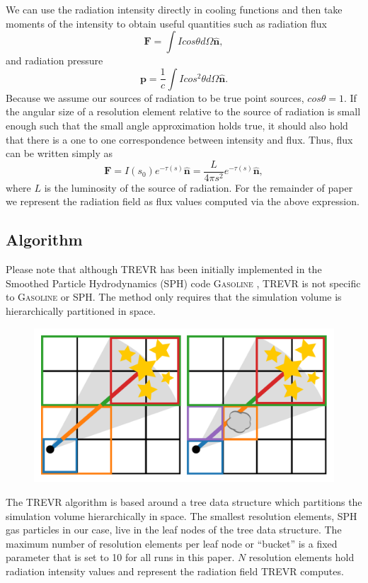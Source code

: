\documentclass[fleq,usenatbib]{mnras}
\newcommand{\acro}{TREVR}
\begin{document}
We can use the radiation intensity directly in cooling functions and then take 
moments of the intensity to obtain useful quantities such as radiation flux 
\begin{equation}
\label{eq:flux}
\mathbf{F} = \int I cos\theta d\Omega \mathbf{\hat{n}},
\end{equation}
and radiation pressure
\begin{equation}
\label{eq:pressure}
\mathbf{p} = \frac{1}{c}\int I cos^2\theta d\Omega \mathbf{\hat{n}}.
\end{equation}
Because we assume our sources of radiation to be true point sources, 
$cos\theta = 1$. If the angular size of a resolution element relative to the 
source of radiation is small enough such that the small angle approximation 
holds true, it should also hold that there is a one to one correspondence 
between intensity and flux. Thus, flux can be written simply as 
\begin{equation}
\label{eq:simpflux}
\mathbf{F} = I(s_0)e^{-\tau(s)} \mathbf{\hat{n}} = \frac{L}{4\pi s^2}
e^{-\tau(s)} \mathbf{\hat{n}},
\end{equation}
where $L$ is the luminosity of the source of radiation. For the remainder of 
paper we represent the radiation field as flux values computed via the above 
expression. 

\subsection{Algorithm}\label{sec:algo}
Please note that although \acro{} has been initially implemented in the 
Smoothed Particle Hydrodynamics (SPH) code \textsc{Gasoline} 
\citep{wadsleyEt03}, \acro{} is not specific to \textsc{Gasoline} or SPH. The 
method only requires that the simulation volume is hierarchically partitioned 
in space.
 
\begin{figure}
\includegraphics[width=1\linewidth]{Figures/algorithm.pdf}
\caption{}
\label{fig:algorithm}
\end{figure}
The \acro{} algorithm is based around a tree data structure which partitions 
the simulation volume hierarchically in space. The smallest resolution 
elements, SPH gas particles in our case, live in the leaf nodes of the tree
data structure. The maximum number of resolution elements per leaf node or 
``bucket'' is a fixed parameter that is set to 10 for all runs in this 
paper. $N$ resolution elements hold radiation intensity values and 
represent the radiation field \acro{} computes. 
\end{document}
